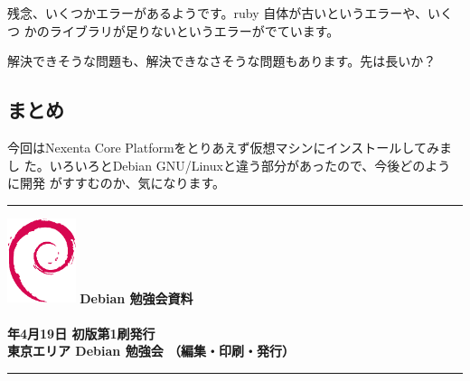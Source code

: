 \documentclass[mingoth,a4paper]{jsarticle}
\newcommand{\debmtgyear}{2008}
\newcommand{\debmtgmonth}{4}
\newcommand{\debmtgdate}{19}
\begin{document}
残念、いくつかエラーがあるようです。ruby 自体が古いというエラーや、いくつ
かのライブラリが足りないというエラーがでています。

解決できそうな問題も、解決できなさそうな問題もあります。先は長いか？

\subsection{まとめ}

今回はNexenta Core Platformをとりあえず仮想マシンにインストールしてみまし
た。いろいろとDebian GNU/Linuxと違う部分があったので、今後どのように開発
がすすむのか、気になります。

\clearpage


\cleartooddpage

\vspace*{15cm}
\hrule
\vspace{2mm}
\includegraphics[width=2cm]{image200502/openlogo-nd.eps}
\noindent \Large \bf Debian 勉強会資料\\ \\
\noindent \normalfont \debmtgyear{}年\debmtgmonth{}月\debmtgdate{}日 \hspace{5mm}  初版第1刷発行\\
\noindent \normalfont 東京エリア Debian 勉強会 （編集・印刷・発行）\\
\hrule
\end{document}
